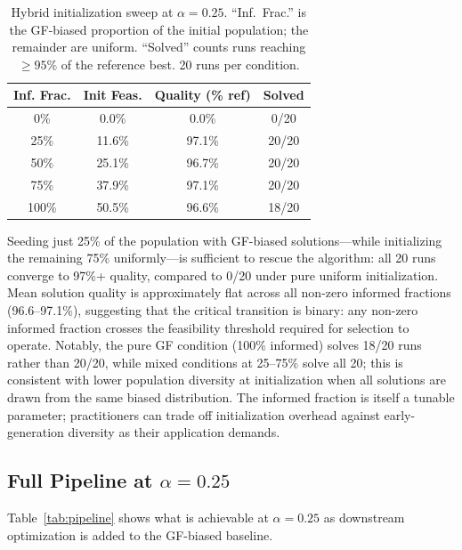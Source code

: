 \documentclass[twocolumn]{article}
\begin{document}
\begin{table}[H]
\centering
\begin{tabular}{cccc}
\toprule
Inf. Frac. & Init Feas. & Quality (\% ref) & Solved \\
\midrule
0\%   & 0.0\%  & 0.0\%  & 0/20 \\
25\%  & 11.6\% & 97.1\% & 20/20 \\
50\%  & 25.1\% & 96.7\% & 20/20 \\
75\%  & 37.9\% & 97.1\% & 20/20 \\
100\% & 50.5\% & 96.6\% & 18/20 \\
\bottomrule
\end{tabular}
\caption{Hybrid initialization sweep at $\alpha = 0.25$. ``Inf.\ Frac.'' 
is the GF-biased proportion of the initial population; the remainder 
are uniform. ``Solved'' counts runs reaching $\geq 95\%$ of the 
reference best. 20 runs per condition.}
\label{tab:hybrid}
\end{table}

Seeding just 25\% of the population with GF-biased solutions---while 
initializing the remaining 75\% uniformly---is sufficient to rescue 
the algorithm: all 20 runs converge to 97\%+ quality, compared to 0/20 
under pure uniform initialization. Mean solution quality is approximately 
flat across all non-zero informed fractions (96.6--97.1\%), suggesting 
that the critical transition is binary: any non-zero informed fraction 
crosses the feasibility threshold required for selection to operate. 
Notably, the pure GF condition (100\% informed) solves 18/20 runs rather 
than 20/20, while mixed conditions at 25--75\% solve all 20; this is 
consistent with lower population diversity at initialization when all 
solutions are drawn from the same biased distribution. The informed 
fraction is itself a tunable parameter; practitioners can trade off 
initialization overhead against early-generation diversity as their 
application demands.

\subsection{Full Pipeline at $\alpha = 0.25$}
\label{sec:pipeline}

Table~\ref{tab:pipeline} shows what is achievable at $\alpha = 0.25$ 
as downstream optimization is added to the GF-biased baseline.
\end{document}
